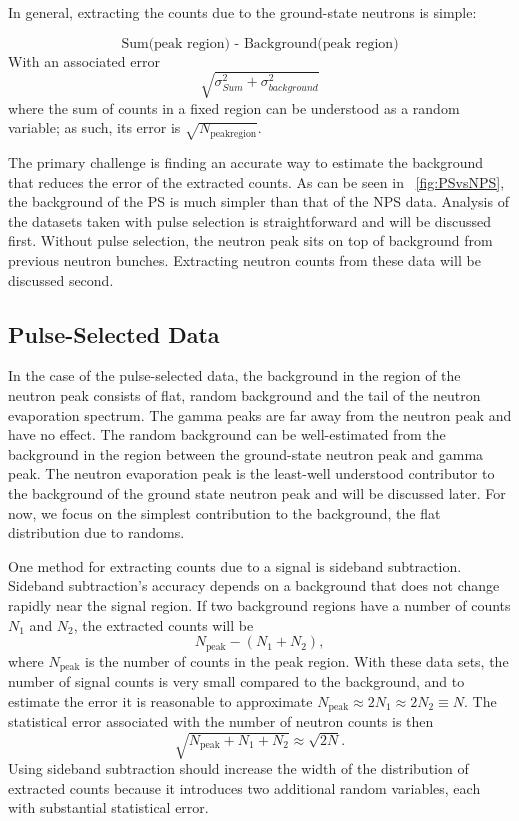 In general, extracting the counts due to the ground-state neutrons is simple:

\begin{equation}
\text{Sum(peak region) - Background(peak region)}
\label{eq:counts}
\end{equation}
With an associated error
\begin{equation}
\sqrt{\sigma_{Sum}^2 + \sigma_{background}^2}
\label{eq:errDef}
\end{equation}
where the sum of counts in a fixed region can be understood as a random variable; as such, its error is $\sqrt{N_{\text{peakregion}}}$.

The primary challenge is finding an accurate way to estimate the background that reduces the error of the extracted counts.  As can be seen in {\fig}~\ref{fig:PSvsNPS}, the background of the PS is much simpler than that of the NPS data.  Analysis of the datasets taken with pulse selection is straightforward and will be discussed first.  Without pulse selection, the neutron peak sits on top of background from previous neutron bunches.  Extracting neutron counts from these data will be discussed second.

\subsection{Pulse-Selected Data}
In the case of the pulse-selected data, the background in the region of the neutron peak consists of flat, random background and the tail of the neutron evaporation spectrum.  The gamma peaks are far away from the neutron peak and have no effect.  The random background can be well-estimated from the background in the region between the ground-state neutron peak and gamma peak.  The neutron evaporation peak is the least-well understood contributor to the background of the ground state neutron peak and will be discussed later.  For now, we focus on the simplest contribution to the background, the flat distribution due to randoms.

One method for extracting counts due to a signal is sideband subtraction.  Sideband subtraction's accuracy depends on a background that does not change rapidly near the signal region.  If two background regions have a number of counts $N_1$ and $N_2$, the extracted counts will be
\begin{equation}
N_{\text{peak}} - (N_1 + N_2),
\end{equation}
where $N_{\text{peak}}$ is the number of counts in the peak region.  With these data sets, the number of signal counts is very small compared to the background, and to estimate the error it is reasonable to approximate $N_{\text{peak}} \approx 2 N_1 \approx 2 N_2 \equiv N$.  The statistical error associated with the number of neutron counts is then
\begin{equation}
\sqrt{N_{\text{peak}} + N_1 + N_2} \approx \sqrt{2 N}.
\end{equation}
Using sideband subtraction should increase the width of the distribution of extracted counts because it introduces two additional random variables, each with substantial statistical error.  

